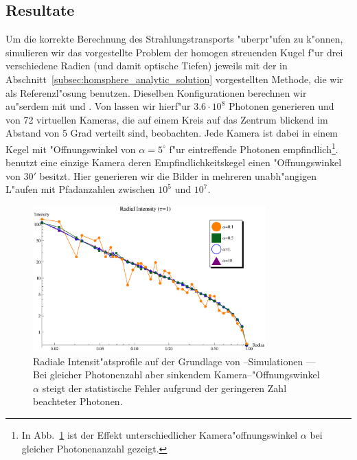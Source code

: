 	\subsection{Resultate}
	Um die korrekte Berechnung des Strahlungstransports "uberpr"ufen zu k"onnen, simulieren wir das vorgestellte Problem der homogen streuenden Kugel f"ur drei verschiedene Radien (und damit optische Tiefen) jeweils mit der in Abschnitt~\ref{subsec:homsphere_analytic_solution} vorgestellten Methode, die wir als Referenzl"osung benutzen. Dieselben Konfigurationen berechnen wir au"serdem mit \mctd und \pirate. Von \mctd lassen wir hierf"ur $3.6\cdot10^8$ Photonen generieren und von 72 virtuellen Kameras, die auf einem Kreis auf das Zentrum blickend im Abstand von 5 Grad verteilt sind, beobachten. Jede Kamera ist dabei in einem Kegel mit "Offnungswinkel von $\alpha=5^\circ$ f"ur eintreffende Photonen empfindlich\footnote{In Abb.~\ref{fig:alphacomparison} ist der Effekt unterschiedlicher Kamera"offnungswinkel $\alpha$ bei gleicher Photonenanzahl gezeigt.}. \pirate benutzt eine einzige Kamera deren Empfindlichkeitskegel einen "Offnungswinkel von $30'$ besitzt. Hier generieren wir die Bilder in mehreren unabh"angigen L"aufen mit Pfadanzahlen zwischen $10^5$ und $10^7$.
	
		\begin{figure}
			\centering
			\includegraphics[width=0.8\textwidth]{mc3dalphasplot.eps}
			\caption{Radiale Intensit"atsprofile auf der Grundlage von \mctd--Simulationen --- Bei gleicher Photonenzahl aber sinkendem Kamera--"Offnungswinkel $\alpha$ steigt der statistische Fehler aufgrund der geringeren Zahl beachteter Photonen.}
			\label{fig:alphacomparison}
		\end{figure}
		

